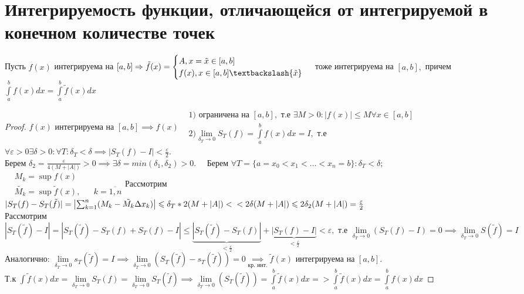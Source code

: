 \documentclass[../main.tex]{subfiles}
\begin{document}
\section{Интегрируемость функции, отличающейся от интегрируемой в конечном количестве точек} 
\begin{theorem}
    Пусть $f(x)$ интегрируема на $[a,b]\implies \tilde{f}(x)=\begin{cases}
        A, x=\tilde{x}\in[a,b]\\ 
        f(x),x\in[a,b] \textbackslash  \{\tilde{x}\}
    \end{cases}$ тоже интегрируема на $[a,b],$ причем $\int\limits_{a}^{b}f(x)dx=\int\limits_{a}^{b}\tilde{f}(x)dx$
\end{theorem}
\begin{proof}
    $f(x)$ интегрируема на $[a,b]\implies f(x)$$\begin{aligned}&1)\text{ ограничена на }[a,b],\text{ т.е } \exists M>0:|f(x)|\leqslant M \forall x\in[a,b] \\ &2)\lim\limits_{\delta_{T}\to 0}  S_{T}(f)=\int\limits_{a}^{b}f(x)dx=I,\text{ т.е }\end{aligned}$ \\ 
    $\forall \varepsilon>0 \exists \delta>0: \forall T: \delta_{T}<\delta \implies|S_{T}(f)-I|<\frac{\varepsilon}{2}.$\\
    Берем $\delta_{2}=\frac{\varepsilon}{4(M+|A|)}>0 \implies \exists \delta=min(\delta_{1},\delta_{2})>0.\quad \text{ Берем } \forall T=\{a=x_{0}<x_{1}<\dots<x_{n}=b\}: \delta_{T}<\delta;$ \\ 
    $\begin{aligned}
        &M_{k}=\sup f(x) \\ 
        &\tilde{M_{k}}=\sup \tilde{f}(x), &&k=\overline{1,n}
    \end{aligned}$Рассмотрим $|S_{T}(f)-S_{T}(\tilde{f})|=\left|\sum_{k=1}^{n}(M_{k}-\tilde{M_{k}}\Delta x_{k})\right|\leqslant \delta_{T}*2 (M+|A|)<\\<2\delta(M+|A|)\leqslant 2\delta_{2}(M+|A|)=\frac{\varepsilon}{2}$ \\ 
    Рассмотрим $|S_{T}(\tilde{f})-I|=|S_{T}(\tilde{f})-S_{T}(f)+S_{T}(f)-I|\leqslant \underbrace{|S_{T}(\tilde{f})-S_{T}(f)|}_{<\frac{\varepsilon}{2}}+\underbrace{|S_{T}(f)-I|}_{<\frac{\varepsilon}{2}}<\varepsilon,\text{ т.е } \lim\limits_{\delta_{T}\to 0}(S_{T}(f)-I)=0\implies\lim\limits_{\delta_{T}\to 0}S(\tilde{f})=I$\\ 
    Аналогично: $\lim\limits_{\delta_{T}\to 0}s_{T}(\tilde{f})=I \implies \lim\limits_{\delta_{T}\to 0} (S_{T}(\tilde{f})-s_{T}(\tilde{f}))=0\underset{\text{кр. инт.}}{\implies} \tilde{f}(x) $ интегрируема на $[a,b]$. \\ 
    Т.к $\int \tilde{f}(x)dx=\lim\limits_{\delta_{T}\to 0}S_{T}(f)=\lim\limits_{\delta_{T}\to 0}S_{T}(\tilde{f})\implies \lim\limits_{\delta_{T}\to 0}(S_{T}(\tilde{f}))=\int\limits_{a}^{b}\tilde{f}(x)dx=> \int\limits_{a}^{b}\tilde{f}(x)dx=\int\limits_{a}^{b}f(x)dx    $
\end{proof}
\end{document}

